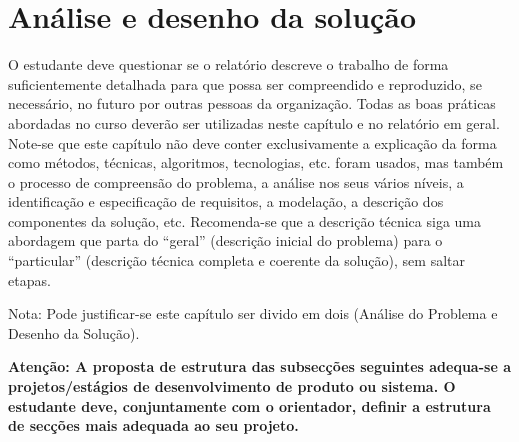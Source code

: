 \chapter{An\'alise e desenho da solu\c{c}\~ao} %
\label{chap:analise_design}

O estudante deve questionar se o relatório descreve o trabalho de forma suficientemente detalhada para que possa ser compreendido e reproduzido, se necessário, no futuro por outras pessoas da organização. Todas as boas práticas abordadas no curso deverão ser utilizadas neste capítulo e no relatório em geral. Note-se que este capítulo não deve conter exclusivamente a explicação da forma como métodos, técnicas, algoritmos, tecnologias, etc. foram usados, mas também o processo de compreensão do problema, a análise nos seus vários níveis, a identificação e especificação de requisitos, a modelação, a descrição dos componentes da solução, etc. Recomenda-se que a descrição técnica siga uma abordagem que parta do “geral” (descrição inicial do problema) para o “particular” (descrição técnica completa e coerente da solução), sem saltar etapas.

Nota: Pode justificar-se este capítulo ser divido em dois (Análise do Problema e Desenho da Solução).


\textbf{Atenção: A proposta de estrutura das subsecções seguintes adequa-se a projetos/estágios de desenvolvimento de produto ou sistema. O estudante deve, conjuntamente com o orientador, definir a estrutura de secções mais adequada ao seu projeto.}







